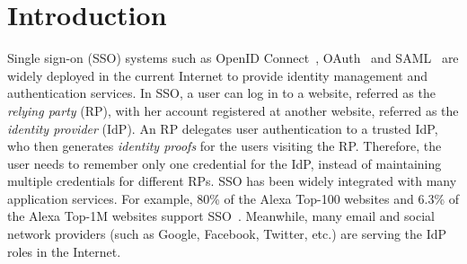 \section{Introduction}
\label{sec:intro}

Single sign-on (SSO) systems such as OpenID Connect~\cite{OpenIDConnect}, OAuth~\cite{rfc6749} and SAML~\cite{SAML} are widely deployed in the current Internet to provide identity management and authentication services. In SSO, a user can log in to a website, referred as the \emph{relying party} (RP), with her account registered at another website, referred as the \emph{identity provider} (IdP). An RP delegates user authentication to a trusted IdP, who then generates \emph{identity proofs} for the users visiting the RP. Therefore, the user needs to remember only one credential for the IdP, instead of maintaining multiple credentials for different RPs.
SSO has been widely integrated with many application services.
For example, 80\% of the Alexa Top-100 websites and 6.3\% of the Alexa Top-1M websites support SSO~\cite{GhasemisharifRC18}.
Meanwhile, many email and social network providers (such as Google, Facebook, Twitter, etc.) are serving the IdP roles in the Internet. %



